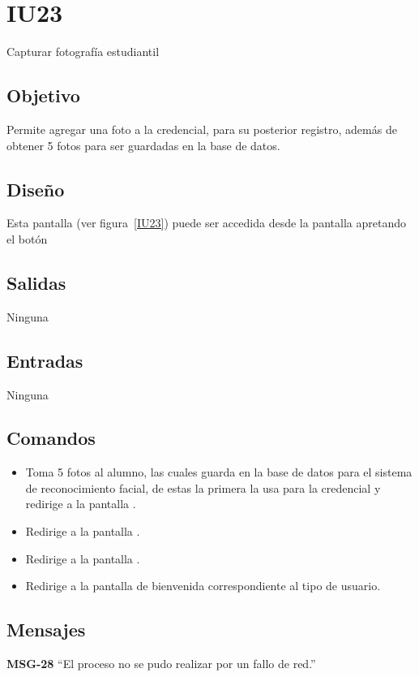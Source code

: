 
\section{IU23} {Capturar fotografía estudiantil}

\subsection{Objetivo}
   Permite agregar una foto a la credencial, para su posterior registro, además de obtener 5 fotos para ser guardadas en la base de datos.
\subsection{Diseño}
    Esta pantalla  (ver figura~\ref{IU23}) puede ser accedida desde la pantalla  apretando el botón 


\subsection{Salidas}
Ninguna
\subsection{Entradas}
Ninguna
\subsection{Comandos}
\begin{itemize}
    \item {} Toma 5 fotos al alumno, las cuales guarda en la base de datos para el sistema de reconocimiento facial, de estas la primera la usa para la credencial y redirige a la pantalla .
    \item {} Redirige a la pantalla .
    \item {} Redirige a la pantalla .
    \item {} Redirige a la pantalla de bienvenida correspondiente al tipo de usuario.
    
\end{itemize}

\subsection{Mensajes}

\begin{Citemize}
    \item {\bf MSG-28}  ``El proceso no se pudo realizar por un fallo de red.''
\end{Citemize}

